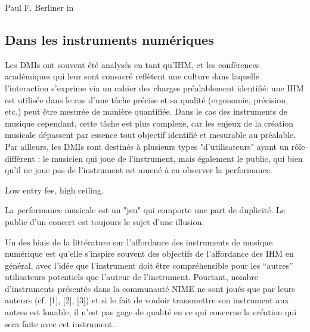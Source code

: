  Paul F. Berliner in \cite{berliner_thinking_2009}


\subsection*{Dans les instruments numériques}


Les \glspl{DMI} ont souvent été analysés en tant qu'\gls{IHM}, et les conférences académiques qui leur sont consacré reflètent une culture dans laquelle l'interaction s'exprime via un cahier des charges préalablement identifié: une \gls{IHM} est utilisée dans le cas d'une tâche précise et sa qualité (ergonomie, précision, etc.) peut être mesurée de manière quantifiée.
Dans le cas des instruments de musique cependant, cette tâche est plus complexe, car les enjeux de la création musicale dépassent par essence tout objectif identifié et mesurable au préalable. Par ailleurs, les \glspl{DMI} sont destinés à plusieurs types "d'utilisateurs" ayant un rôle différent : le musicien qui joue de l'instrument, mais également le public, qui bien qu'il ne joue pas de l'instrument est amené à en observer la performance.

Low entry fee, high ceiling.

La performance musicale est un "jeu" qui comporte une part de duplicité. Le public d'un concert est toujours le sujet d'une illusion. 

Un des biais de la littérature sur l’affordance des instruments de musique numérique est qu’elle s’inspire souvent des objectifs de l’affordance des IHM en général, avec l’idée que l’instrument doit être compréhensible pour les “autres” utilisateurs potentiels que l’auteur de l’instrument. Pourtant, nombre d’instruments présentés dans la communauté NIME ne sont joués que par leurs auteurs (cf. [1], [2], [3]) et si le fait de vouloir transmettre son instrument aux autres est louable, il n’est pas gage de qualité en ce qui concerne la création qui sera faite avec cet instrument. 


